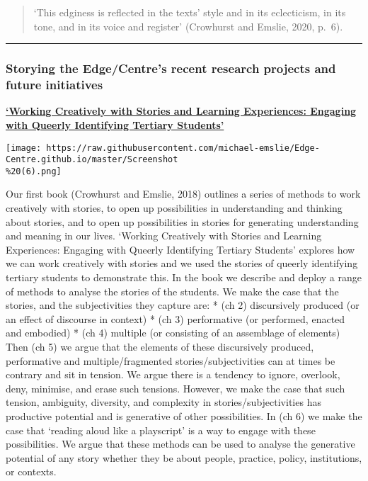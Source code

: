 \documentclass[
]{article}
\begin{document}
\begin{quote}
`This edginess is reflected in the texts' style and in its eclecticism,
in its tone, and in its voice and register' (Crowhurst and Emslie, 2020,
p.~6).
\end{quote}

\begin{center}\rule{0.5\linewidth}{0.5pt}\end{center}

\hypertarget{storying-the-edgecentres-recent-research-projects-and-future-initiatives}{%
\subsubsection{\texorpdfstring{Storying the Edge/Centre's recent
research projects and future initiatives
}{Storying the Edge/Centre's recent research projects and future initiatives  }}\label{storying-the-edgecentres-recent-research-projects-and-future-initiatives}}

\href{https://www.palgrave.com/gp/book/9783319697536}{\textbf{`Working
Creatively with Stories and Learning Experiences: Engaging with Queerly
Identifying Tertiary Students'}}

\texttt{[image: https://raw.githubusercontent.com/michael-emslie/Edge-Centre.github.io/master/Screenshot\\\%20(6).png]}

Our first book (Crowhurst and Emslie, 2018) outlines a series of methods
to work creatively with stories, to open up possibilities in
understanding and thinking about stories, and to open up possibilities
in stories for generating understanding and meaning in our lives.
`Working Creatively with Stories and Learning Experiences: Engaging with
Queerly Identifying Tertiary Students' explores how we can work
creatively with stories and we used the stories of queerly identifying
tertiary students to demonstrate this. In the book we describe and
deploy a range of methods to analyse the stories of the students. We
make the case that the stories, and the subjectivities they capture are:
* (ch 2) discursively produced (or an effect of discourse in context) *
(ch 3) performative (or performed, enacted and embodied) * (ch 4)
multiple (or consisting of an assemblage of elements) Then (ch 5) we
argue that the elements of these discursively produced, performative and
multiple/fragmented stories/subjectivities can at times be contrary and
sit in tension. We argue there is a tendency to ignore, overlook, deny,
minimise, and erase such tensions. However, we make the case that such
tension, ambiguity, diversity, and complexity in stories/subjectivities
has productive potential and is generative of other possibilities. In
(ch 6) we make the case that `reading aloud like a playscript' is a way
to engage with these possibilities. We argue that these methods can be
used to analyse the generative potential of any story whether they be
about people, practice, policy, institutions, or contexts.
\end{document}

